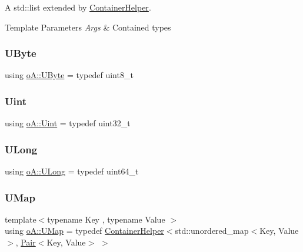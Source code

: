 A std\+::list extended by \mbox{\hyperlink{classo_a_1_1_container_helper}{Container\+Helper}}. 


\begin{DoxyTemplParams}{Template Parameters}
{\em Args} & Contained types \\
\hline
\end{DoxyTemplParams}
\mbox{\label{namespaceo_a_a8c38e43a304d568b8495770dd8d50513}} 
\subsubsection{\texorpdfstring{U\+Byte}{UByte}}
{\footnotesize\ttfamily using \mbox{\hyperlink{namespaceo_a_a8c38e43a304d568b8495770dd8d50513}{o\+A\+::\+U\+Byte}} = typedef uint8\+\_\+t}

\mbox{\label{namespaceo_a_abe1d8250226c5cf34f84d7b75fc7922e}} 
\subsubsection{\texorpdfstring{Uint}{Uint}}
{\footnotesize\ttfamily using \mbox{\hyperlink{namespaceo_a_abe1d8250226c5cf34f84d7b75fc7922e}{o\+A\+::\+Uint}} = typedef uint32\+\_\+t}

\mbox{\label{namespaceo_a_aeb20ba1e00df0faadde3654ff7d8c4e7}} 
\subsubsection{\texorpdfstring{U\+Long}{ULong}}
{\footnotesize\ttfamily using \mbox{\hyperlink{namespaceo_a_aeb20ba1e00df0faadde3654ff7d8c4e7}{o\+A\+::\+U\+Long}} = typedef uint64\+\_\+t}

\mbox{\label{namespaceo_a_a7541113114ad6ecaa07c0228d7e23ed7}} 
\subsubsection{\texorpdfstring{U\+Map}{UMap}}
{\footnotesize\ttfamily template$<$typename Key , typename Value $>$ \\
using \mbox{\hyperlink{namespaceo_a_a7541113114ad6ecaa07c0228d7e23ed7}{o\+A\+::\+U\+Map}} = typedef \mbox{\hyperlink{classo_a_1_1_container_helper}{Container\+Helper}}$<$std\+::unordered\+\_\+map$<$Key, Value$>$, \mbox{\hyperlink{namespaceo_a_a2e4add9f777dcae3f5afde9e90c75b66}{Pair}}$<$Key, Value$>$ $>$}




